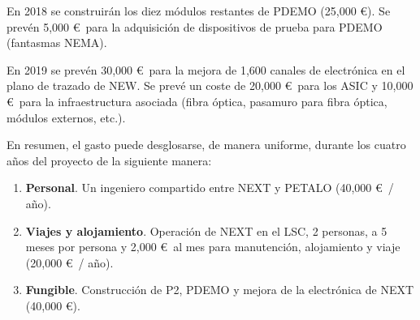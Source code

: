 En 2018 se construirán los diez módulos restantes de PDEMO (25,000 \euro). Se prevén 5,000 \euro\ para la adquisición de dispositivos de prueba para PDEMO (fantasmas NEMA). 

En 2019 se prevén 30,000 \euro\ para la mejora de 1,600 canales de electrónica en el plano de trazado de NEW. Se prevé un coste de 20,000 \euro\ para los ASIC y 10,000 \euro\ para la infraestructura asociada (fibra óptica, pasamuro para fibra óptica, módulos externos, etc.).

En resumen, el gasto puede desglosarse, de manera uniforme, durante los cuatro años del proyecto de la siguiente manera:
\begin{enumerate}
\item {\bf Personal}. Un ingeniero compartido entre NEXT y PETALO (40,000 \euro\ / año).
\item {\bf Viajes y alojamiento}. Operación de NEXT en el LSC, 2 personas, a 5 meses por persona y 2,000 \euro\ al mes para manutención, alojamiento y viaje (20,000 \euro\ / año).
\item {\bf Fungible}. Construcción de P2, PDEMO y mejora de la electrónica de NEXT (40,000 \euro).

\end{enumerate}
